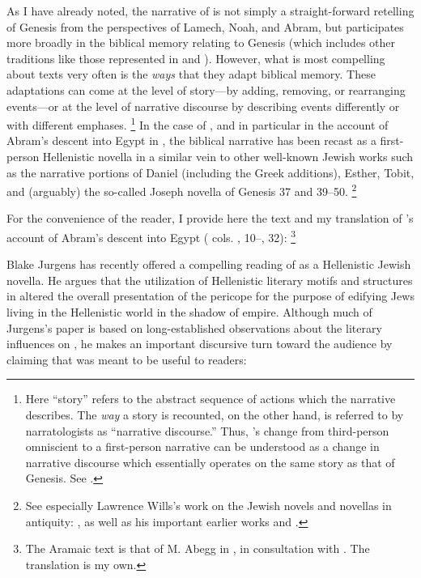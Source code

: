 As I have already noted, the narrative of \ga is not simply a straight-forward retelling of Genesis from the perspectives of Lamech, Noah, and Abram, but participates more broadly in the biblical memory relating to Genesis (which includes other traditions like those represented in \firstenoch and \jub). However, what is most compelling about \rwb texts very often is the \emph{ways} that they adapt biblical memory. These adaptations can come at the level of story---by adding, removing, or rearranging events---or at the level of narrative discourse by describing events differently or with different emphases.%
    \footnote{Here ``story'' refers to the abstract sequence of actions which the narrative describes. The \emph{way} a story is recounted, on the other hand, is referred to by narratologists as ``narrative discourse.'' Thus, \ga's change from third-person omniscient to a \psgraphical first-person narrative can be understood as a change in narrative discourse which essentially operates on the same story as that of Genesis. See \cite[13--27, esp. 18--19]{abbott2008}.}
In the case of \ga, and in particular in the account of Abram's descent into Egypt in , the biblical narrative has been recast as a first-person Hellenistic novella in a similar vein to other well-known \secondtemple Jewish works such as the narrative portions of Daniel (including the Greek additions), Esther, Tobit, and (arguably) the so-called Joseph novella of Genesis 37 and 39--50.%
    \footnote{See especially Lawrence Wills's work on the Jewish novels and novellas in antiquity: \cite*{wills_jsj2011}, \cite*{wills2002} as well as his important earlier works \cite*{wills1995} and \cite*{wills1990}.}

For the convenience of the reader, I provide here the text and my translation of \ga's account of Abram's descent into Egypt ( cols. , 10--, 32):%
    \footnote{The Aramaic text is that of M. Abegg in \cite[1:534--537]{perry-tov2014}, in consultation with \cite{fitzmyer2004}. The translation is my own.}




\noindent
Blake Jurgens has recently offered a compelling reading of \ga {} as a Hellenistic Jewish novella. He argues that the utilization of Hellenistic literary motifs and structures in \ga altered the overall presentation of the pericope for the purpose of edifying Jews living in the Hellenistic world in the shadow of empire.%
    \autocite{jurgens_jsj2018}
Although much of Jurgens's paper is based on long-established observations about the literary influences on \ga, he makes an important discursive turn toward the audience by claiming that \ga was meant to be useful to readers:

